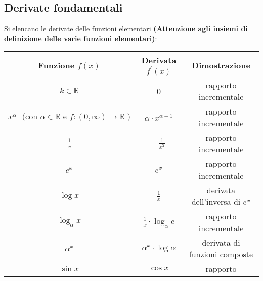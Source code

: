 \documentclass[a4paper,12pt, oneside]{book}
\begin{document}
\subsection{Derivate fondamentali} Si elencano le derivate delle funzioni
elementari \textbf{(Attenzione agli insiemi di \\ definizione delle varie
  funzioni elementari)}:\\ \setlength{\tabcolsep}{0.5em}
{\renewcommand{\arraystretch}{1.6}
  \begin{tabular}{|c|c|c|} \hline \textbf{Funzione} $f(x)$ & \textbf{Derivata}
                                                             $f^{'}(x)$ & \textbf{Dimostrazione} \\ \hline\hline $k\in \mathbb{R}$ & 0 &
                                                                                                                                         rapporto incrementale \\[1ex] \hline $x^{\alpha} \mbox{ } (\mbox{con } \alpha\in
    \mathbb{R} \mbox{ e } f:(0,\infty)\rightarrow \mathbb{R}\mbox{ )}$ &
                                                                         $\alpha\cdot x^{\alpha -1}$ & rapporto incrementale \\[1ex] \hline $\frac{1}{x}$
                                                           & $-\frac{1}{x^2}$ & rapporto incrementale \\ \hline $e^x$ & $e^x$ & rapporto
                                                                                                                                incrementale \\[1ex] \hline $\log x$ & $\frac{1}{x}$ & derivata dell'inversa di
                                                                                                                                                                                       $e^x$ \\[1ex] \hline $\log_\alpha x$ & $\frac{1}{x}\cdot \log_\alpha e$ &
                                                                                                                                                                                                                                                                 rapporto incrementale \\ \hline $\alpha^x$ & $\alpha^x \cdot \log\alpha$ &
                                                                                                                                                                                                                                                                                                                                            derivata di funzioni composte \\[1ex] \hline $\sin x$ & $\cos x$ & rapporto

\end{tabular}}
\end{document}
